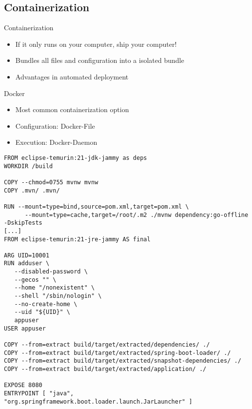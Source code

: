 \subsection{Containerization}
\begin{frame}[fragile]{\insertsubsection}
	\begin{fancycolumns}[widths={30}]
		\begin{definition}{Containerization}
			\begin{itemize}
				\item If it only runs on your computer, ship your computer!
				\item Bundles all files and configuration into a isolated bundle
				\item Advantages in automated deployment
			\end{itemize}
		\end{definition}
		\begin{note}{Docker}
			\begin{itemize}
				\item Most common containerization option
				\item Configuration: Docker-File
				\item Execution: Docker-Daemon
			\end{itemize}
		\end{note}
		\nextcolumn
		\begin{lstlisting}[language={}, basicstyle=\tiny, breaklines=true, numbers=none]
FROM eclipse-temurin:21-jdk-jammy as deps
WORKDIR /build

COPY --chmod=0755 mvnw mvnw
COPY .mvn/ .mvn/

RUN --mount=type=bind,source=pom.xml,target=pom.xml \
      --mount=type=cache,target=/root/.m2 ./mvnw dependency:go-offline -DskipTests
[...]
FROM eclipse-temurin:21-jre-jammy AS final

ARG UID=10001
RUN adduser \
   --disabled-password \
   --gecos "" \
   --home "/nonexistent" \
   --shell "/sbin/nologin" \
   --no-create-home \
   --uid "${UID}" \
   appuser
USER appuser

COPY --from=extract build/target/extracted/dependencies/ ./
COPY --from=extract build/target/extracted/spring-boot-loader/ ./
COPY --from=extract build/target/extracted/snapshot-dependencies/ ./
COPY --from=extract build/target/extracted/application/ ./

EXPOSE 8080
ENTRYPOINT [ "java", "org.springframework.boot.loader.launch.JarLauncher" ]
		\end{lstlisting}
	\end{fancycolumns}
\end{frame}

